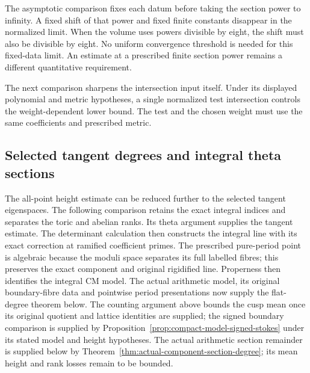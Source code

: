 The asymptotic comparison fixes each datum before taking the section
power to infinity. A fixed shift of that power and fixed finite
constants disappear in the normalized limit. When the volume uses
powers divisible by eight, the shift must also be divisible by eight.
No uniform convergence threshold is needed for this fixed-data limit.
An estimate at a prescribed finite section power remains a different
quantitative requirement.

The next comparison sharpens the intersection input itself. Under its
displayed polynomial and metric hypotheses, a single normalized test
intersection controls the weight-dependent lower bound. The test and
the chosen weight must use the same coefficients and prescribed metric.












\subsection{Selected tangent degrees and integral theta sections}

The all-point height estimate can be reduced further to the selected
tangent eigenspaces. The following comparison retains the exact
integral indices and separates the toric and abelian ranks. Its
theta argument supplies the tangent estimate. The determinant calculation
then constructs the integral line with its exact correction at ramified
coefficient primes. The prescribed pure-period point is algebraic
because the moduli space separates its full labelled fibres; this
preserves the exact component and original rigidified line. Properness
then identifies the integral CM model. The actual arithmetic model,
its original boundary-fibre data and pointwise period presentations
now supply the flat-degree theorem below. The counting argument above bounds the
cusp mean once its original quotient and lattice identities are supplied;
the signed boundary comparison is supplied by
Proposition~\ref{prop:compact-model-signed-stokes} under its stated
model and height hypotheses. The actual arithmetic section remainder
is supplied below by Theorem~\ref{thm:actual-component-section-degree};
its mean height and rank losses remain to be bounded.

